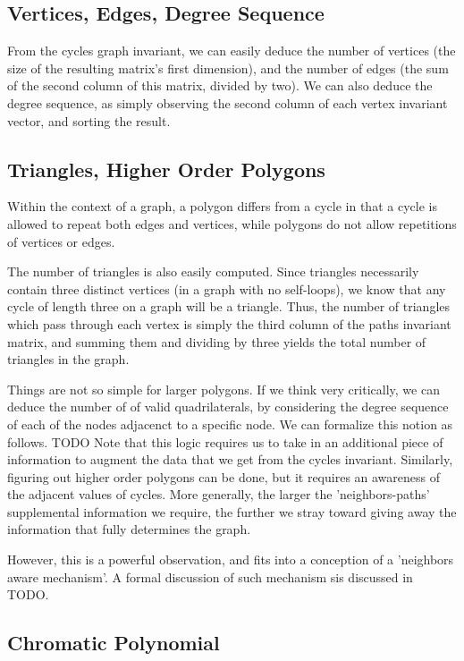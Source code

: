 \documentclass[11pt,a4paper]{report}
\begin{document}
\subsection{Vertices, Edges, Degree Sequence}
From the cycles graph invariant, we can easily deduce the number of vertices (the size of the resulting matrix's first dimension), and the number of edges (the sum of the second column of this matrix, divided by two).
We can also deduce the degree sequence, as simply observing the second column of each vertex invariant vector, and sorting the result.

\subsection{Triangles, Higher Order Polygons}
Within the context of a graph, a polygon differs from a cycle in that a cycle is allowed to repeat both edges and vertices, while polygons do not allow repetitions of vertices or edges.

The number of triangles is also easily computed.  Since triangles necessarily contain three distinct vertices (in a graph with no self-loops), we know that any cycle of length three on a graph will be a triangle.
Thus, the number of triangles which pass through each vertex is simply the third column of the paths invariant matrix, and summing them and dividing by three yields the total number of triangles in the graph.

Things are not so simple for larger polygons.  If we think very critically, we can deduce the number of of valid quadrilaterals, by considering the degree sequence of each of the nodes adjacenct to a specific node.
We can formalize this notion as follows.
TODO
Note that this logic requires us to take in an additional piece of information to augment the data that we get from the cycles invariant.
Similarly, figuring out higher order polygons can be done, but it requires an awareness of the adjacent values of cycles.
More generally, the larger the 'neighbors-paths' supplemental information we require, the further we stray toward giving away the information that fully determines the graph.

However, this is a powerful observation, and fits into a conception of a 'neighbors aware mechanism'. A formal discussion of such mechanism sis discussed in TODO.

\subsection{Chromatic Polynomial}
\end{document}
